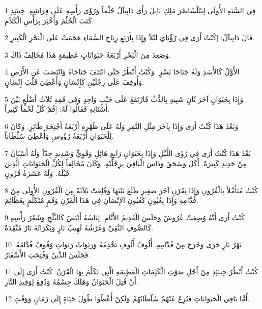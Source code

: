 \par 1 فِي السَّنَةِ الأُولَى لِبَيْلْشَاصَّرَ مَلِكِ بَابِلَ رَأَى دَانِيآلُ حُلْماً وَرُؤَى رَأْسِهِ عَلَى فِرَاشِهِ. حِينَئِذٍ كَتَبَ الْحُلْمَ وَأَخْبَرَ بِرَأْسِ الْكَلاَمِ.
\par 2 قَالَ دَانِيآلُ: [كُنْتُ أَرَى فِي رُؤْيَايَ لَيْلاً وَإِذَا بِأَرْبَعِ رِيَاحِ السَّمَاءِ هَجَمَتْ عَلَى الْبَحْرِ الْكَبِيرِ.
\par 3 وَصَعِدَ مِنَ الْبَحْرِ أَرْبَعَةُ حَيَوَانَاتٍ عَظِيمَةٍ هَذَا مُخَالِفٌ ذَاكَ.
\par 4 الأَوَّلُ كَالأَسَدِ وَلَهُ جَنَاحَا نَسْرٍ. وَكُنْتُ أَنْظُرُ حَتَّى انْتَتَفَ جَنَاحَاهُ وَانْتَصَبَ عَنِ الأَرْضِ وَأُوقِفَ عَلَى رِجْلَيْنِ كَإِنْسَانٍ وَأُعْطِيَ قَلْبَ إِنْسَانٍ.
\par 5 وَإِذَا بِحَيَوَانٍ آخَرَ ثَانٍ شَبِيهٍ بِالدُّبِّ فَارْتَفَعَ عَلَى جَنْبٍ وَاحِدٍ وَفِي فَمِهِ ثَلاَثُ أَضْلُعٍ بَيْنَ أَسْنَانِهِ فَقَالُوا لَهُ: [قُمْ كُلْ لَحْماً كَثِيراً.
\par 6 وَبَعْدَ هَذَا كُنْتُ أَرَى وَإِذَا بِآخَرَ مِثْلِ النَّمِرِ وَلَهُ عَلَى ظَهْرِهِ أَرْبَعَةُ أَجْنِحَةِ طَائِرٍ. وَكَانَ لِلْحَيَوَانِ أَرْبَعَةُ رُؤُوسٍ وَأُعْطِيَ سُلْطَاناً.
\par 7 بَعْدَ هَذَا كُنْتُ أَرَى فِي رُؤَى اللَّيْلِ وَإِذَا بِحَيَوَانٍ رَابِعٍ هَائِلٍ وَقَوِيٍّ وَشَدِيدٍ جِدّاً وَلَهُ أَسْنَانٌ مِنْ حَدِيدٍ كَبِيرَةٌ. أَكَلَ وَسَحَقَ وَدَاسَ الْبَاقِيَ بِرِجْلَيْهِ. وَكَانَ مُخَالِفاً لِكُلِّ الْحَيَوَانَاتِ الَّذِينَ قَبْلَهُ. وَلَهُ عَشَرَةُ قُرُونٍ.
\par 8 كُنْتُ مُتَأَمِّلاً بِالْقُرُونِ وَإِذَا بِقَرْنٍ آخَرَ صَغِيرٍ طَلَعَ بَيْنَهَا وَقُلِعَتْ ثَلاَثَةٌ مِنَ الْقُرُونِ الأُولَى مِنْ قُدَّامِهِ وَإِذَا بِعُيُونٍ كَعُيُونِ الإِنْسَانِ فِي هَذَا الْقَرْنِ وَفَمٍ مُتَكَلِّمٍ بِعَظَائِمَ.
\par 9 كُنْتُ أَرَى أَنَّهُ وُضِعَتْ عُرُوشٌ وَجَلَسَ الْقَدِيمُ الأَيَّامِ. لِبَاسُهُ أَبْيَضُ كَالثَّلْجِ وَشَعْرُ رَأْسِهِ كَالصُّوفِ النَّقِيِّ وَعَرْشُهُ لَهِيبُ نَارٍ وَبَكَرَاتُهُ نَارٌ مُتَّقِدَةٌ.
\par 10 نَهْرُ نَارٍ جَرَى وَخَرَجَ مِنْ قُدَّامِهِ. أُلُوفُ أُلُوفٍ تَخْدِمُهُ وَرَبَوَاتُ رَبَوَاتٍ وُقُوفٌ قُدَّامَهُ. فَجَلَسَ الدِّينُ وَفُتِحَتِ الأَسْفَارُ.
\par 11 كُنْتُ أَنْظُرُ حِينَئِذٍ مِنْ أَجْلِ صَوْتِ الْكَلِمَاتِ الْعَظِيمَةِ الَّتِي تَكَلَّمَ بِهَا الْقَرْنُ. كُنْتُ أَرَى إِلَى أَنْ قُتِلَ الْحَيَوَانُ وَهَلَكَ جِسْمُهُ وَدُفِعَ لِوَقِيدِ النَّارِ.
\par 12 أَمَّا بَاقِي الْحَيَوَانَاتِ فَنُزِعَ عَنْهُمْ سُلْطَانُهُمْ وَلَكِنْ أُعْطُوا طُولَ حَيَاةٍ إِلَى زَمَانٍ وَوَقْتٍ.
